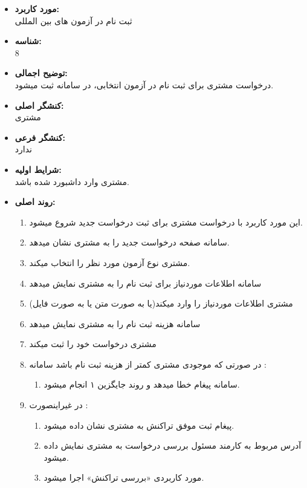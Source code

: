 \documentclass{article}
\begin{document}
\noindent\makebox[\linewidth]{\rule{\paperwidth}{0.4pt}}

\begin{itemize}
\item \textbf{مورد کاربرد:}\\
ثبت نام در آزمون های بین المللی
\item \textbf{شناسه:}\\
8
\item \textbf{توضیح اجمالی:}\\
درخواست مشتری برای ثبت نام در آزمون انتخابی، در سامانه ثبت میشود.
\item \textbf{کنشگر اصلی:}\\
مشتری
\item \textbf{کنشگر فرعی:}\\
ندارد
\item \textbf{شرایط اولیه:}\\
مشتری وارد داشبورد شده باشد.
\item \textbf{روند اصلی:}\\
\begin{enumerate}
\item  این مورد کاربرد با درخواست مشتری برای ثبت درخواست جدید شروع میشود.
\item سامانه صفحه درخواست جدید را به مشتری نشان میدهد.
\item مشتری نوع آزمون مورد نظر را انتخاب میکند.
\item سامانه اطلاعات موردنیاز برای ثبت نام را به مشتری نمایش میدهد
\item مشتری اطلاعات موردنیاز را وارد میکند(یا به صورت متن یا به صورت فایل)
\item سامانه هزینه ثبت نام را به مشتری نمایش میدهد
\item مشتری درخواست خود را ثبت میکند
\item در صورتی که موجودی مشتری کمتر از هزینه ثبت نام باشد سامانه :
\begin{enumerate}
\item سامانه پیغام خطا میدهد و روند جایگزین ۱ انجام میشود. 
\end{enumerate}

\item در غیراینصورت	:
\begin{enumerate}
\item پیغام ثبت موفق تراکنش به مشتری نشان داده میشود.
\item آدرس مربوط به کارمند مسئول بررسی درخواست به مشتری نمایش داده میشود.
\item مورد کاربردی «بررسی تراکنش» اجرا میشود.
\end{enumerate}


\end{enumerate}
\end{itemize}
\end{document}
